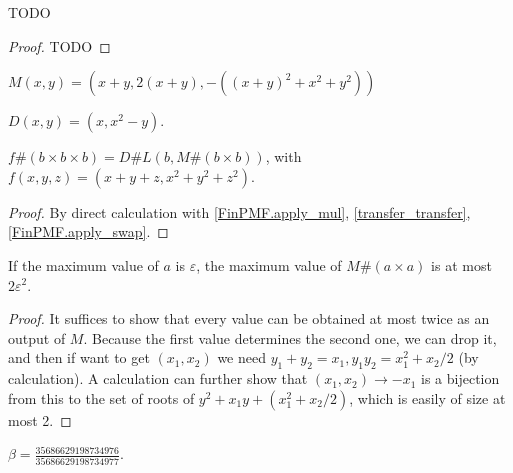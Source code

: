 \begin{theorem}
    \label{line_point_large_l2}
    \leanok
    TODO
\end{theorem}

\begin{proof}
    \leanok
    TODO
\end{proof}

\begin{definition}
    \label{lmap}
    \leanok
    $M(x, y) = (x+y, 2(x+y), -((x+y)^2 + x^2 + y^2))$
\end{definition}

\begin{definition}
    \label{decoder}
    \leanok
    $D(x,y) = (x, x^2 - y)$.
\end{definition}

\begin{lemma}
    \label{jurl}
    \leanok
    $f \# (b \times b \times b) = D \# L(b, M \# (b \times b))$, with $f(x, y, z) = (x+y+z, x^2+y^2+z^2)$.
\end{lemma}

\begin{proof}
    \leanok
    By direct calculation with \ref{FinPMF.apply_mul}, \ref{transfer_transfer}, \ref{FinPMF.apply_swap}.
\end{proof}

\begin{lemma}
    \label{max_val_of_apply_lmap}
    \leanok
    If the maximum value of $a$ is $\varepsilon$, the maximum value of $M \# (a \times a)$ is at most $2 \varepsilon^2$.
\end{lemma}

\begin{proof}
    \leanok
    It suffices to show that every value can be obtained at most twice as an output of $M$.
    Because the first value determines the second one, we can drop it, and then if want to get
    $(x_1, x_2)$ we need $y_1 + y_2 = x_1, y_1 y_2 = x_1^2 + x_2 /2 $ (by calculation).
    A calculation can further show that $(x_1, x_2) \to -x_1$ is a bijection from this to the set of roots of
    $y^2 + x_1 y + (x_1^2 + x_2/2)$, which is easily of size at most 2.
\end{proof}

\begin{definition}
    \label{bourgainβ}
    \leanok
    $\beta = \frac{35686629198734976}{35686629198734977}$.
\end{definition}

